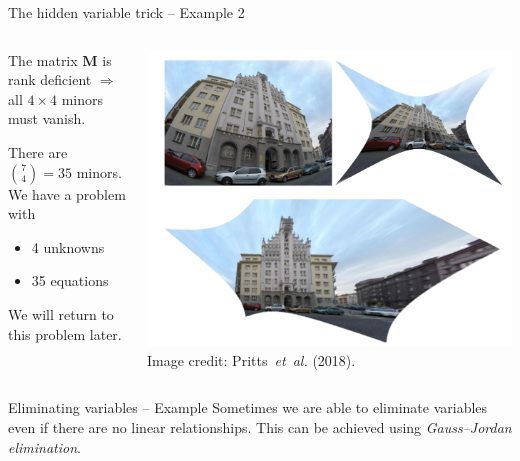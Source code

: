 \documentclass[aspectratio=169]{beamer}
\makeatletter
\newcommand{\etal}{\emph{et~al.}}
\newcommand{\mat}[1]{\bm{#1}}
\DeclareRobustCommand\etal{\emph{et~al}\@ifnextchar.{}{.\@}}
\makeatother
\begin{document}
\begin{frame}[t]{The hidden variable trick -- Example 2}
\begin{columns}
    \begin{column}{0.5\textwidth}
        \begin{minipage}[t][\textheight][t]{\textwidth}
        \hiddenvariableTwoeHeight
        The matrix $\mat{M}$ is rank deficient $\Rightarrow$
        all $4\times 4$ minors must vanish.

        There are $\binom{7}{4}=35$ minors. We have a problem with
        \begin{itemize}
            \item 4 unknowns
            \item 35 equations
        \end{itemize}

        We will return to this problem later.
        \end{minipage}
    \end{column}%
    \begin{column}{0.5\textwidth}
        \centering
        \includegraphics[width=\linewidth]{images/conjugate_trans.png}
        {\scriptsize Image credit: Pritts~\etal{} (2018).}
    \end{column}
\end{columns}
\end{frame}

\begin{frame}{Eliminating variables -- Example}
Sometimes we are able to eliminate variables even if there are no linear relationships. This
can be achieved using \emph{Gauss--Jordan elimination}.
\end{frame}
\end{document}
